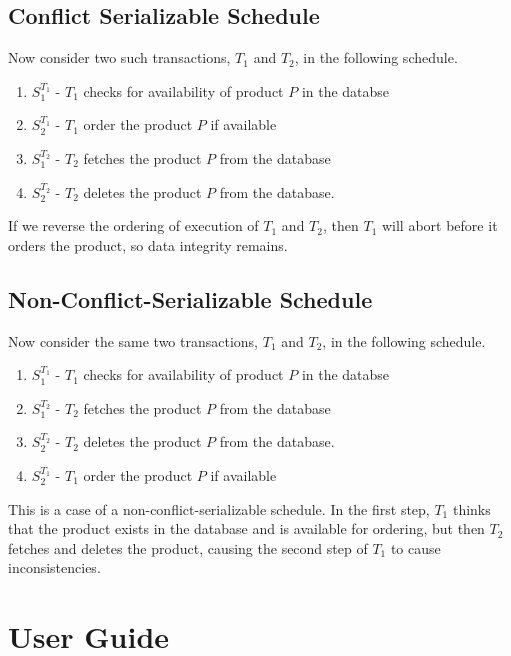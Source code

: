 \documentclass[12pt]{article}
\begin{document}
\subsection{Conflict Serializable Schedule}

Now consider two such transactions, $T_1$ and $T_2$, in the following schedule.

\begin{enumerate}
    \item $S_1^{T_1}$ - $T_1$ checks for availability of product $P$ in the databse
    \item $S_2^{T_1}$ - $T_1$ order the product $P$ if available 
    \item $S_1^{T_2}$ - $T_2$ fetches the product $P$ from the database
    \item $S_2^{T_2}$ - $T_2$ deletes the product $P$ from the database. 
\end{enumerate}

If we reverse the ordering of execution of $T_1$ and $T_2$, then $T_1$ will abort before it orders the product, so data integrity remains. 

\subsection{Non-Conflict-Serializable Schedule}


Now consider the same two transactions, $T_1$ and $T_2$, in the following schedule.

\begin{enumerate}
    \item $S_1^{T_1}$ - $T_1$ checks for availability of product $P$ in the databse
    \item $S_1^{T_2}$ - $T_2$ fetches the product $P$ from the database
    \item $S_2^{T_2}$ - $T_2$ deletes the product $P$ from the database. 
    \item $S_2^{T_1}$ - $T_1$ order the product $P$ if available 
\end{enumerate}

This is a case of a non-conflict-serializable schedule. In the first step, $T_1$ thinks that the product exists in the database and is available for ordering, but then $T_2$ fetches and deletes the product, causing the second step of $T_1$ to cause inconsistencies.

\section{User Guide}
\end{document}
